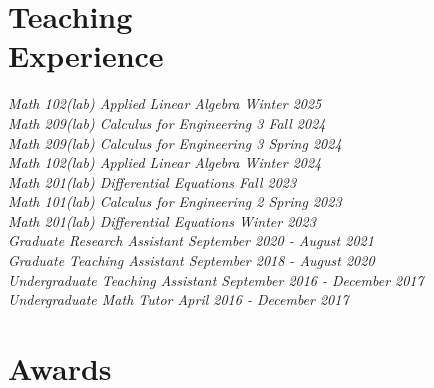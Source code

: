 \documentclass[margin]{res}
\begin{document}
\begin{resume}


\section{Teaching\\Experience}

\textsl{Math 102(lab) Applied Linear Algebra \hfill{Winter 2025}\\}
\textsl{Math 209(lab) Calculus for Engineering 3 \hfill{Fall 2024}\\}
\textsl{Math 209(lab) Calculus for Engineering 3 \hfill{Spring 2024}\\}
\textsl{Math 102(lab) Applied Linear Algebra \hfill{Winter 2024}\\}
\textsl{Math 201(lab) Differential Equations \hfill{Fall 2023}\\}
\textsl{Math 101(lab) Calculus for Engineering 2 \hfill{Spring 2023}\\}
\textsl{Math 201(lab) Differential Equations \hfill{Winter 2023}\\}
\textsl{Graduate Research Assistant \hfill{September 2020 - August 2021}\\}
\textsl{Graduate Teaching Assistant \hfill{September 2018 - August 2020}\\}
\textsl{Undergraduate Teaching Assistant \hfill{September 2016 - December 2017}\\}
\textsl{Undergraduate Math Tutor \hfill{April 2016 - December 2017}\\}


\section{Awards}







\end{resume}
\end{document}
